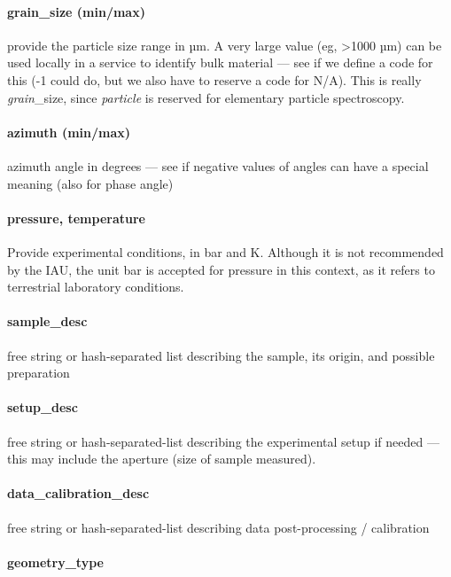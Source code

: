 \documentclass[11pt,a4paper]{ivoa}
\begin{document}
\paragraph{grain\_size (min/max)}

provide the particle size range in µm. A very large value (eg, >1000
µm) can be used locally in a service to identify bulk material --- see
if we define a code for this (-1 could do, but we also have to reserve a
code for N/A). This is really \emph{grain}\_size, since \emph{particle}
is reserved for elementary particle spectroscopy.

\paragraph{azimuth (min/max)}

azimuth angle in degrees --- see if negative values of angles
can have a special meaning (also for phase angle)

\paragraph{pressure, temperature}

Provide experimental conditions, in bar and K. Although it is not recommended
by the IAU, the unit bar is accepted for pressure in this context, as it refers
to terrestrial laboratory conditions.

\paragraph{sample\_desc}

free string or hash-separated list describing the sample, its origin,
and possible preparation

\paragraph{setup\_desc}

free string or hash-separated-list describing the experimental setup if
needed --- this may include the aperture (size of sample measured).

\paragraph{data\_calibration\_desc}

free string or hash-separated-list describing data post-processing /
calibration

\paragraph{geometry\_type}
\end{document}
